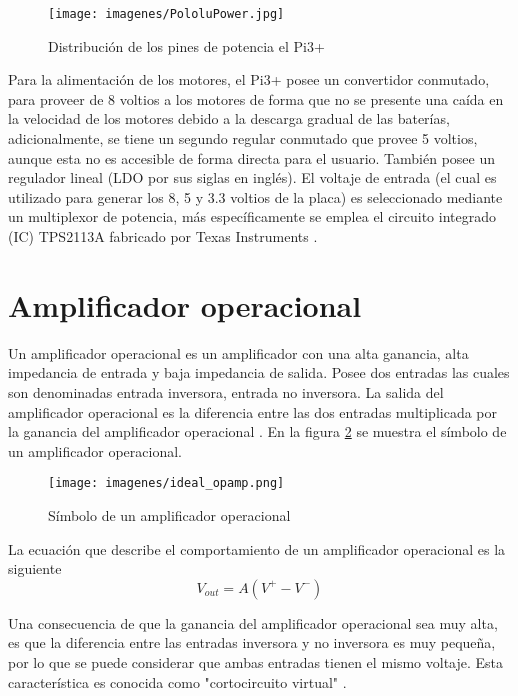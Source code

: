  \begin{figure}[H]
    \centering
    \texttt{[image: imagenes/PololuPower.jpg]}
    \caption{Distribución de los pines de potencia el Pi3+ \cite{noauthor_pololu_nodate}}
    \label{fig:power}
 \end{figure}

 Para la alimentación de los motores, el Pi3+ posee un convertidor conmutado, para proveer de 8 voltios a los motores
 de forma que no se presente una caída en la velocidad de los motores debido a la descarga gradual de las baterías,
 adicionalmente, se tiene un segundo regular conmutado que provee 5 voltios, aunque esta no es accesible de forma directa
 para el usuario. También posee un regulador lineal (LDO por sus siglas en inglés). El voltaje de entrada (el cual es 
 utilizado para generar los 8, 5 y 3.3 voltios de la placa) es seleccionado mediante un multiplexor de potencia, más 
 específicamente se emplea el circuito integrado (IC) TPS2113A fabricado por Texas Instruments \cite{noauthor_pololu_nodate}.

 


\section{Amplificador operacional}

Un amplificador operacional es un amplificador con una alta ganancia,
alta impedancia de entrada y baja impedancia de salida. Posee dos entradas
las cuales son denominadas entrada inversora, entrada no inversora. La salida
del amplificador operacional es la diferencia entre las dos entradas multiplicada
por la ganancia del amplificador operacional \cite{electronic_Boylestad}. En 
la figura \ref{fig:ampOp} se muestra el símbolo de un amplificador operacional.

\begin{figure}[H]
    \centering
    \texttt{[image: imagenes/ideal\_opamp.png]}
    \caption{Símbolo de un amplificador operacional \cite{electronic_Boylestad}}
    \label{fig:ampOp}
\end{figure}

La ecuación que describe el comportamiento de un amplificador operacional es la siguiente
\begin{equation}
    V_{out} = A(V^+ - V^-)
    \label{eq:ampOp}
\end{equation}

Una consecuencia de que la ganancia del amplificador operacional sea muy alta, es que
la diferencia entre las entradas inversora y no inversora es muy pequeña, por lo que
se puede considerar que ambas entradas tienen el mismo voltaje. Esta característica
es conocida como "cortocircuito virtual" \cite{electronic_Boylestad}.

